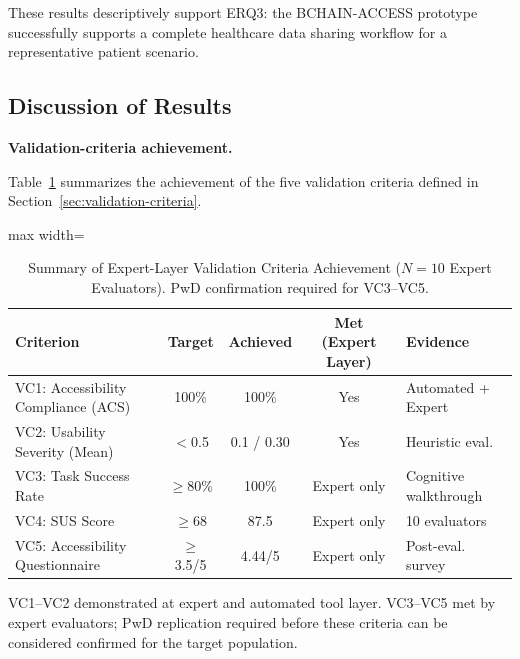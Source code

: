 \documentclass[journal,onecolumn]{IEEEtran}
\begin{document}
These results descriptively support ERQ3: the BCHAIN-ACCESS prototype successfully
supports a complete healthcare data sharing workflow for a
representative patient scenario.

\subsection{Discussion of Results}
\label{subsec:discussion-results}

\noindent\textbf{Validation-criteria achievement.}

Table~\ref{tab:validation-summary} summarizes the achievement of the
five validation criteria defined in Section~\ref{sec:validation-criteria}.

\begin{table}[htbp]
\centering
\caption{Summary of Expert-Layer Validation Criteria Achievement ($N=10$ Expert Evaluators). PwD confirmation required for VC3--VC5.}
\label{tab:validation-summary}
\small
\begin{adjustbox}{max width=\columnwidth}
\begin{tabular}{|p{2.8cm}|c|c|c|p{2.0cm}|}
\hline
\textbf{Criterion} & \textbf{Target} & \textbf{Achieved} & \textbf{Met (Expert Layer)} & \textbf{Evidence} \\
\hline
VC1: Accessibility Compliance (ACS) & 100\% & 100\% & Yes & Automated + Expert \\
\hline
VC2: Usability Severity (Mean) & $<$0.5 & 0.1 / 0.30 & Yes & Heuristic eval. \\
\hline
VC3: Task Success Rate & $\geq$80\% & 100\% & Expert only & Cognitive walkthrough \\
\hline
VC4: SUS Score & $\geq$68 & 87.5 & Expert only & 10 evaluators \\
\hline
VC5: Accessibility Questionnaire & $\geq$3.5/5 & 4.44/5 & Expert only & Post-eval. survey \\
\hline
\end{tabular}
\end{adjustbox}
{\footnotesize VC1--VC2 demonstrated at expert and automated tool layer.
VC3--VC5 met by expert evaluators; PwD replication required before
these criteria can be considered confirmed for the target population.}
\end{table}
\end{document}
